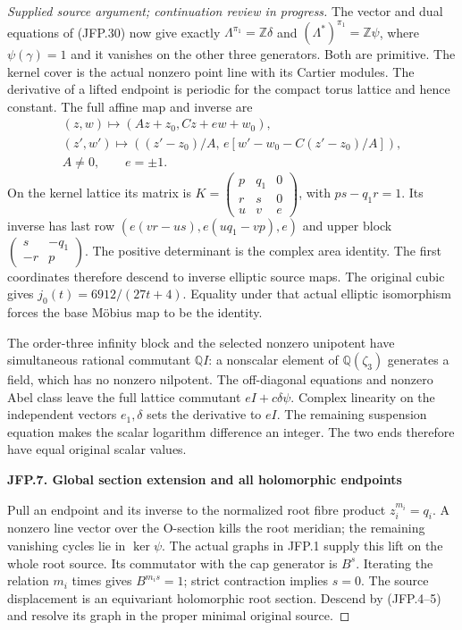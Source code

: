 \begin{proof}[Supplied source argument; continuation review in progress]
The vector and dual equations of (JFP.30) now give exactly
\(\Lambda^{\pi_1}=\mathbb Z\delta\) and
\((\Lambda^*)^{\pi_1}=\mathbb Z\psi\), where \(\psi(\gamma)=1\)
and it vanishes on the other three generators. Both are primitive.
The kernel cover is the actual nonzero point line with its Cartier
modules. The derivative of a lifted endpoint is periodic for the
compact torus lattice and hence constant. The full affine map and
inverse are
\[
\begin{gathered}
 (z,w)\mapsto(Az+z_0,Cz+e w+w_0),\\
 (z',w')\mapsto((z'-z_0)/A,\,
 e[w'-w_0-C(z'-z_0)/A]),\\
 A\ne0,\qquad e=\pm1.
\end{gathered}
\tag{JFP.31}
\]
On the kernel lattice its matrix is
\(K=\left(\begin{smallmatrix}p&q_1&0\\r&s&0\\u&v&e\end{smallmatrix}\right)\),
with \(ps-q_1r=1\). Its inverse has last row
\((e(vr-us),e(uq_1-vp),e)\) and upper block
\(\left(\begin{smallmatrix}s&-q_1\\-r&p\end{smallmatrix}\right)\).
The positive determinant is the complex area identity. The first
coordinates therefore descend to inverse elliptic source maps.
The original cubic gives \(j_0(t)=6912/(27t+4)\). Equality under
that actual elliptic isomorphism forces the base Möbius map to be
the identity.

The order-three infinity block and the selected nonzero unipotent
have simultaneous rational commutant \(\mathbb QI\): a nonscalar
element of \(\mathbb Q(\zeta_3)\) generates a field, which has no
nonzero nilpotent. The off-diagonal equations and nonzero Abel
class leave the full lattice commutant \(eI+c\delta\psi\).
Complex linearity on the independent vectors \(e_1,\delta\)
sets the derivative to \(eI\). The remaining suspension equation
makes the scalar logarithm difference an integer. The two ends
therefore have equal original scalar values.

\par

\medskip\noindent\textbf{JFP.7. Global section extension and all holomorphic endpoints}

\par\nobreak

Pull an endpoint and its inverse to the normalized root fibre
product \(z_i^{m_i}=q_i\). A nonzero line vector over the
O-section kills the root meridian; the remaining vanishing cycles
lie in \(\ker\psi\). The actual graphs in JFP.1 supply this
lift on the whole root source. Its commutator with the cap
generator is \(B^s\). Iterating the relation \(m_i\) times gives
\(B^{m_is}=1\); strict contraction implies \(s=0\).
The source displacement is an equivariant holomorphic root
section. Descend by (JFP.4--5) and resolve its graph in the proper
minimal original source.


\end{proof}

